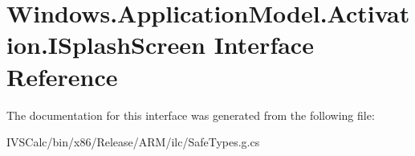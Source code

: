 \hypertarget{interface_windows_1_1_application_model_1_1_activation_1_1_i_splash_screen}{}\section{Windows.\+Application\+Model.\+Activation.\+I\+Splash\+Screen Interface Reference}
\label{interface_windows_1_1_application_model_1_1_activation_1_1_i_splash_screen}


The documentation for this interface was generated from the following file\+:\begin{DoxyCompactItemize}
\item 
I\+V\+S\+Calc/bin/x86/\+Release/\+A\+R\+M/ilc/Safe\+Types.\+g.\+cs\end{DoxyCompactItemize}

